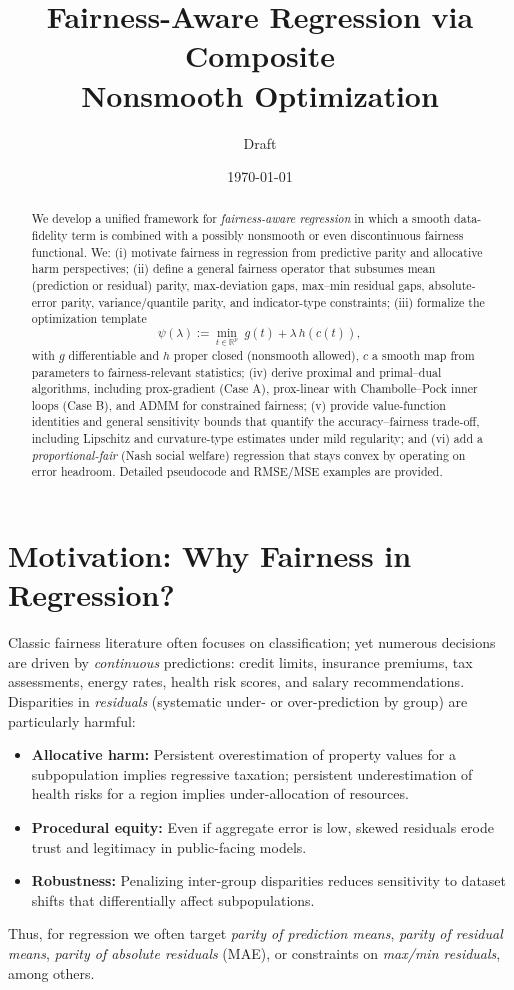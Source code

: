 \documentclass[11pt]{article}
\title{Fairness-Aware Regression via Composite \\Nonsmooth Optimization}
\author{Draft}
\date{\today}
\theoremstyle{plain}
\theoremstyle{definition}
\newcommand{\R}{\mathbb{R}}
\newcommand{\1}{\mathbf{1}}
\begin{document}
\maketitle

\begin{abstract}
We develop a unified framework for \emph{fairness-aware regression} in which a smooth data-fidelity term is combined with a possibly nonsmooth or even discontinuous fairness functional. We: (i) motivate fairness in regression from predictive parity and allocative harm perspectives; (ii) define a general fairness operator that subsumes mean (prediction or residual) parity, max-deviation gaps, max--min residual gaps, absolute-error parity, variance/quantile parity, and indicator-type constraints; (iii) formalize the optimization template
\[
\psi(\lambda):=\min_{t\in\R^p}\; g(t)+\lambda\,h(c(t)),
\]
with $g$ differentiable and $h$ proper closed (nonsmooth allowed), $c$ a smooth map from parameters to fairness-relevant statistics; (iv) derive proximal and primal--dual algorithms, including prox-gradient (Case A), prox-linear with Chambolle--Pock inner loops (Case B), and ADMM for constrained fairness; (v) provide value-function identities and general sensitivity bounds that quantify the accuracy--fairness trade-off, including Lipschitz and curvature-type estimates under mild regularity; and (vi) add a \emph{proportional-fair} (Nash social welfare) regression that stays convex by operating on error headroom. Detailed pseudocode and RMSE/MSE examples are provided.
\end{abstract}

\section{Motivation: Why Fairness in Regression?}
Classic fairness literature often focuses on classification; yet numerous decisions are driven by \emph{continuous} predictions: credit limits, insurance premiums, tax assessments, energy rates, health risk scores, and salary recommendations. Disparities in \emph{residuals} (systematic under- or over-prediction by group) are particularly harmful:
\begin{itemize}[leftmargin=2em]
\item \textbf{Allocative harm:} Persistent overestimation of property values for a subpopulation implies regressive taxation; persistent underestimation of health risks for a region implies under-allocation of resources.
\item \textbf{Procedural equity:} Even if aggregate error is low, skewed residuals erode trust and legitimacy in public-facing models.
\item \textbf{Robustness:} Penalizing inter-group disparities reduces sensitivity to dataset shifts that differentially affect subpopulations.
\end{itemize}
Thus, for regression we often target \emph{parity of prediction means}, \emph{parity of residual means}, \emph{parity of absolute residuals} (MAE), or constraints on \emph{max/min residuals}, among others.
\end{document}
